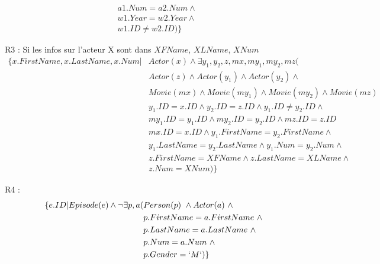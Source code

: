 \documentclass[a4paper,12pt]{article}
\begin{document}
\begin{list}{-}{}
\begin{align*}
      & a1.Num = a2.Num \wedge \\
      & w1.Year = w2.Year \wedge \\
      & w1.ID \neq w2.ID ) \}
    \end{align*}
  \item R3 :
    Si les infos sur l'acteur X sont dans $XFName$, $XLName$, $XNum$
    \begin{align*}
      \{ x.FirstName, x.LastName, x.Num | &Actor(x) \wedge \exists y_1, y_2, z, mx, my_1, my_2, mz ( \\
      & Actor(z) \wedge Actor(y_1) \wedge Actor(y_2) \wedge \\
      & Movie(mx) \wedge Movie(my_1) \wedge Movie(my_2) \wedge Movie(mz) \\
      & y_1.ID = x.ID \wedge y_2.ID = z.ID \wedge y_1.ID \neq y_2.ID \wedge \\
      & my_1.ID = y_1.ID \wedge my_2.ID = y_2.ID \wedge mz.ID = z.ID \\
      & mx.ID = x.ID \wedge y_1.FirstName = y_2.FirstName \wedge \\
      & y_1.LastName = y_2.LastName \wedge y_1.Num = y_2.Num \wedge \\
      & z.FirstName = XFName \wedge z.LastName = XLName \wedge \\
      & z.Num = XNum)\}
    \end{align*}
  \item R4 :
    \begin{align*}
      \{ e.ID | Episode(e) \wedge \lnot \exists p, a (&Person(p) ~\wedge Actor(a) ~\wedge \\
        & p.FirstName = a.FirstName ~\wedge \\
        & p.LastName = a.LastName ~\wedge \\
        & p.Num = a.Num ~\wedge \\
        & p.Gender = `M`)\}
    \end{align*}
\end{list}
          
\end{document}
